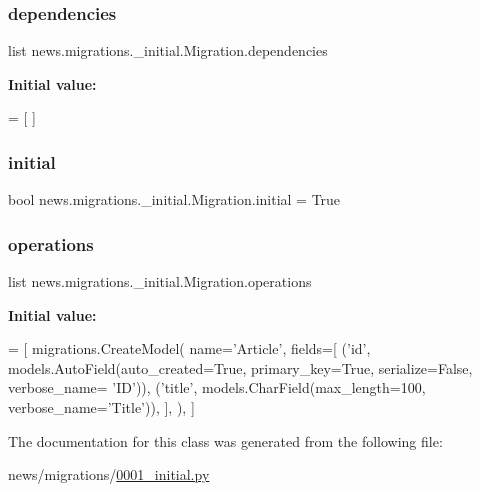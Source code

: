 \subsubsection{\texorpdfstring{dependencies}{dependencies}}
{\footnotesize\ttfamily list news.\+migrations.\+\_\+initial.\+Migration.\+dependencies\hspace{0.3cm}{\ttfamily [static]}}

{\bfseries Initial value\+:}
\begin{DoxyCode}
=  [
    ]
\end{DoxyCode}
\mbox{\label{classnews_1_1migrations_1_10001__initial_1_1_migration_aabc5dbf8fca555e21bb4e345893694a2}} 
\subsubsection{\texorpdfstring{initial}{initial}}
{\footnotesize\ttfamily bool news.\+migrations.\+\_\+initial.\+Migration.\+initial = True\hspace{0.3cm}{\ttfamily [static]}}

\mbox{\label{classnews_1_1migrations_1_10001__initial_1_1_migration_ae137eaa618a2a194cebaab9f59d42526}} 
\subsubsection{\texorpdfstring{operations}{operations}}
{\footnotesize\ttfamily list news.\+migrations.\+\_\+initial.\+Migration.\+operations\hspace{0.3cm}{\ttfamily [static]}}

{\bfseries Initial value\+:}
\begin{DoxyCode}
=  [
        migrations.CreateModel(
            name=\textcolor{stringliteral}{'Article'},
            fields=[
                (\textcolor{stringliteral}{'id'}, models.AutoField(auto\_created=\textcolor{keyword}{True}, primary\_key=\textcolor{keyword}{True}, serialize=\textcolor{keyword}{False}, verbose\_name=\textcolor{stringliteral}{
      'ID'})),
                (\textcolor{stringliteral}{'title'}, models.CharField(max\_length=100, verbose\_name=\textcolor{stringliteral}{'Title'})),
            ],
        ),
    ]
\end{DoxyCode}


The documentation for this class was generated from the following file\+:\begin{DoxyCompactItemize}
\item 
news/migrations/\mbox{\hyperlink{0001__initial_8py}{0001\+\_\+initial.\+py}}\end{DoxyCompactItemize}
